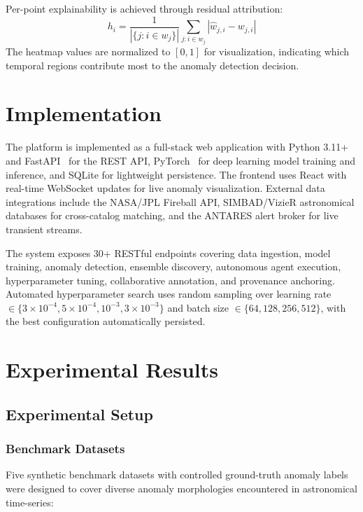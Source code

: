 \documentclass[conference]{IEEEtran}
\begin{document}
Per-point explainability is achieved through residual attribution:
\begin{equation}
h_i = \frac{1}{|\{j : i \in w_j\}|} \sum_{j: i \in w_j} |\hat{w}_{j,i} - w_{j,i}|
\end{equation}
The heatmap values are normalized to $[0, 1]$ for visualization, indicating which temporal regions contribute most to the anomaly detection decision.

\section{Implementation}
\label{sec:implementation}

The platform is implemented as a full-stack web application with Python 3.11+ and FastAPI~\cite{ramirez2018fastapi} for the REST API, PyTorch~\cite{paszke2019pytorch} for deep learning model training and inference, and SQLite for lightweight persistence. The frontend uses React with real-time WebSocket updates for live anomaly visualization. External data integrations include the NASA/JPL Fireball API, SIMBAD/VizieR astronomical databases for cross-catalog matching, and the ANTARES alert broker for live transient streams.

The system exposes 30+ RESTful endpoints covering data ingestion, model training, anomaly detection, ensemble discovery, autonomous agent execution, hyperparameter tuning, collaborative annotation, and provenance anchoring. Automated hyperparameter search uses random sampling over learning rate $\in \{3\times10^{-4}, 5\times10^{-4}, 10^{-3}, 3\times10^{-3}\}$ and batch size $\in \{64, 128, 256, 512\}$, with the best configuration automatically persisted.

\section{Experimental Results}
\label{sec:results}

\subsection{Experimental Setup}

\subsubsection{Benchmark Datasets}
Five synthetic benchmark datasets with controlled ground-truth anomaly labels were designed to cover diverse anomaly morphologies encountered in astronomical time-series:
\end{document}
